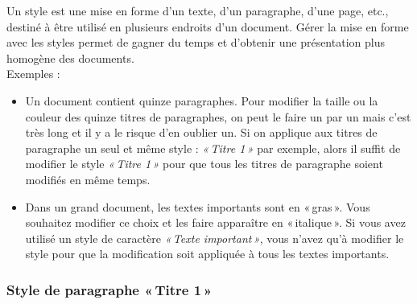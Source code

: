 Un style est une mise en forme d'un texte, d'un paragraphe, d'une page, etc., destiné à être utilisé en plusieurs endroits d'un document. Gérer la mise en forme avec les styles permet de gagner du temps et d'obtenir une présentation plus homogène des documents.\\

Exemples :
\begin{itemize}
\item Un document contient quinze paragraphes. Pour modifier la taille ou la couleur des quinze titres de paragraphes, on peut le faire un par un mais c'est très long et il y a le risque d'en oublier un. Si on applique aux titres de paragraphe un seul et même style : \emph{«\,Titre 1\,»} par exemple, alors il suffit de modifier le style \emph{«\,Titre 1\,»} pour que tous les titres de paragraphe soient modifiés en même temps.
\item Dans un grand document, les textes importants sont en «\,gras\,». Vous souhaitez modifier ce choix et les faire apparaître en «\,italique\,». Si vous avez utilisé un style de caractère \emph{«\,Texte important\,»}, vous n'avez qu'à modifier le style pour que la modification soit appliquée à tous les textes importants.
\end{itemize}

\subsubsection{Style de paragraphe «\,Titre 1\,»}

